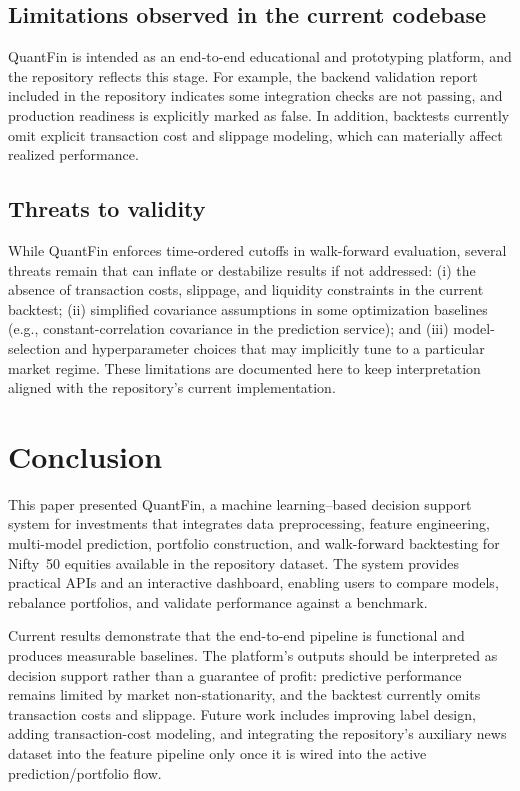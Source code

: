 \documentclass[conference]{IEEEtran}
\begin{document}
\subsection{Limitations observed in the current codebase}
QuantFin is intended as an end-to-end educational and prototyping platform, and the repository reflects this stage. For example, the backend validation report included in the repository indicates some integration checks are not passing, and production readiness is explicitly marked as false. In addition, backtests currently omit explicit transaction cost and slippage modeling, which can materially affect realized performance.

\subsection{Threats to validity}
While QuantFin enforces time-ordered cutoffs in walk-forward evaluation, several threats remain that can inflate or destabilize results if not addressed: (i) the absence of transaction costs, slippage, and liquidity constraints in the current backtest; (ii) simplified covariance assumptions in some optimization baselines (e.g., constant-correlation covariance in the prediction service); and (iii) model-selection and hyperparameter choices that may implicitly tune to a particular market regime. These limitations are documented here to keep interpretation aligned with the repository's current implementation.

\FloatBarrier

\section{Conclusion}\label{sec:con}
This paper presented QuantFin, a machine learning--based decision support system for investments that integrates data preprocessing, feature engineering, multi-model prediction, portfolio construction, and walk-forward backtesting for Nifty~50 equities available in the repository dataset. The system provides practical APIs and an interactive dashboard, enabling users to compare models, rebalance portfolios, and validate performance against a benchmark.

Current results demonstrate that the end-to-end pipeline is functional and produces measurable baselines. The platform's outputs should be interpreted as decision support rather than a guarantee of profit: predictive performance remains limited by market non-stationarity, and the backtest currently omits transaction costs and slippage. Future work includes improving label design, adding transaction-cost modeling, and integrating the repository's auxiliary news dataset into the feature pipeline only once it is wired into the active prediction/portfolio flow.



\end{document}
